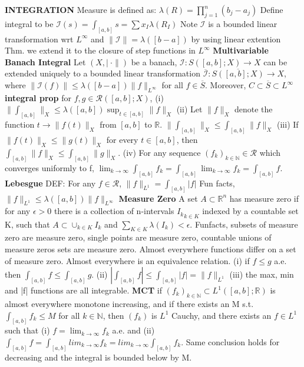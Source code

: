 \documentclass{article}
\theoremstyle{definition}
\begin{document}
\textbf{INTEGRATION} Measure is defined as: $\lambda(R) = \prod^n_{j=1} (b_j-a_j)$ Define integral to be $\mathscr{I}(s) = \int_{[a,b]} s = \sum x_I \lambda(R_I)$ Note $\mathscr{I}$ is a bounded linear transformation wrt $L^\infty$ and $\|\mathscr{I}\| = \lambda([b-a])$ by using linear extention Thm. we extend it to the closure of step functions in $L^\infty$
\textbf{Multivariable Banach Integral} Let $(X,|\ \cdot\|)$ be a banach, $\mathscr{I}:  S([a,b];X) \to X$ can be 
extended uniquely to a bounded linear transformation $ \overline{ \mathscr{I} }: \overline{S([a,b];X)}\to X$, 
where $\| \mathscr{I}(f) \|\leq \lambda([b-a]) \| f \|_{L^\infty}$ for all 
$f \in \overline S$. Moreover, $C \subset \overline S \subset L^\infty$
\textbf{integral prop} for $f,g \in \mathscr{R}([a,b];X)$, (i) $\|\int_{[a,b]} \|_X \leq \lambda([a,b])\sup_{t\in[a,b]} \|f\|_X$ (ii) Let $\|f\|_X$ denote the function $t \to \|f(t) \|_X$ from $[a,b]$ to $\mathbb{R}$. $\|\int_{[a,b]}\|_X \leq \int _{[a,b]} \|f\|_X$ (iii) If $\|f(t)\|_X \leq \|g(t)\|_X$ for every $t \in [a,b]$, then $\int_{[a,b]} \|f\|_X \leq \int_{[a,b]} \|g\|_X $. (iv) For any sequence $(f_k)_{k \in \mathbb{N}} \in \mathscr{R}$ which converges uniformly to f, $\lim_{k\to \infty} \int_{[a,b]} f_k = \int_{[a,b]} \lim_{k\to \infty} f_k = \int_{[a,b]} f$.
\textbf{Lebesgue} DEF: For any $ f \in \mathscr{R}$, $\|f\|_{L^1} = \int_{[a,b]} |f|$ Fun facts, $\|f\|_{L^1} \leq \lambda([a,b]) \|f\|_{L^\infty}$
\textbf{Measure Zero} A set $A \subset \mathbb{R}^n$ has measure zero if for any $\epsilon > 0$ there is a collection of n-intervals ${I_k}_{k \in K}$ indexed by a countable set K, such that $A \subset \cup_{k \in K}I_k$ and $\sum_{K \in K} \lambda(I_k) < \epsilon$. Funfacts, subsets of measure zero are measure zero, single points are measure zero, countable unions of measure zeros sets are measure zero. Almost everywhere functions differ on a set of measure zero. Almost everywhere is an equivalence relation. (i) if $f \leq g$ a.e. then $\int _{[a,b]} f \leq \int_{[a,b]} g$. (ii) $|\int_{[a,b]} f | \leq \int_{[a,b]} |f| = \|f\|_{L^1}$ (iii) the max, min and |f| functions are all integrable.
\textbf{MCT} if $(f_k)_{k \in \mathbb{N}} \subset L^1([a,b];\mathbb{R})$ is almost everywhere monotone increasing, and if there exists an M s.t. $\int_{[a,b]} f_k \leq M$ for all $k \in \mathbb{N}$, then $(f_k)$ is $L^1$ Cauchy, and there exists an $f \in L^1$ such that (i) $ f = \lim_{k \to \infty} f_k$ a.e. and (ii) $ \int_{[a,b]} f = \int_{[a,b]}lim_{k \to \infty} f_k = lim_{k \to \infty} \int_{[a,b]} f_k$. Same conclusion holds for decreasing and the integral is bounded below by M.
\end{document}
